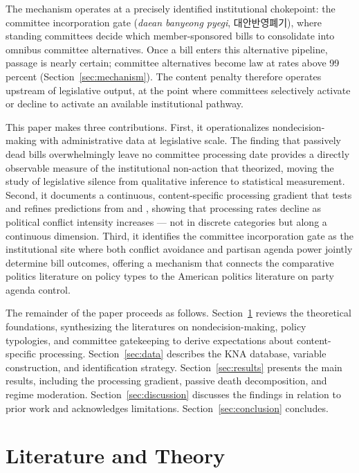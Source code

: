 \documentclass[11pt]{article}
\begin{document}
The mechanism operates at a precisely identified institutional chokepoint: the committee incorporation gate (\textit{daean banyeong pyegi}, 대안반영폐기), where standing committees decide which member-sponsored bills to consolidate into omnibus committee alternatives. Once a bill enters this alternative pipeline, passage is nearly certain; committee alternatives become law at rates above 99 percent (Section~\ref{sec:mechanism}). The content penalty therefore operates upstream of legislative output, at the point where committees selectively activate or decline to activate an available institutional pathway.

This paper makes three contributions. First, it operationalizes nondecision-making with administrative data at legislative scale. The finding that passively dead bills overwhelmingly leave no committee processing date provides a directly observable measure of the institutional non-action that \citet{bachrach1962} theorized, moving the study of legislative silence from qualitative inference to statistical measurement. Second, it documents a continuous, content-specific processing gradient that tests and refines predictions from \citet{lowi1964} and \citet{wilson1980}, showing that processing rates decline as political conflict intensity increases --- not in discrete categories but along a continuous dimension. Third, it identifies the committee incorporation gate as the institutional site where both conflict avoidance and partisan agenda power jointly determine bill outcomes, offering a mechanism that connects the comparative politics literature on policy types to the American politics literature on party agenda control.

The remainder of the paper proceeds as follows. Section~\ref{sec:lit} reviews the theoretical foundations, synthesizing the literatures on nondecision-making, policy typologies, and committee gatekeeping to derive expectations about content-specific processing. Section~\ref{sec:data} describes the KNA database, variable construction, and identification strategy. Section~\ref{sec:results} presents the main results, including the processing gradient, passive death decomposition, and regime moderation. Section~\ref{sec:discussion} discusses the findings in relation to prior work and acknowledges limitations. Section~\ref{sec:conclusion} concludes.

\section{Literature and Theory}
\label{sec:lit}
\end{document}
